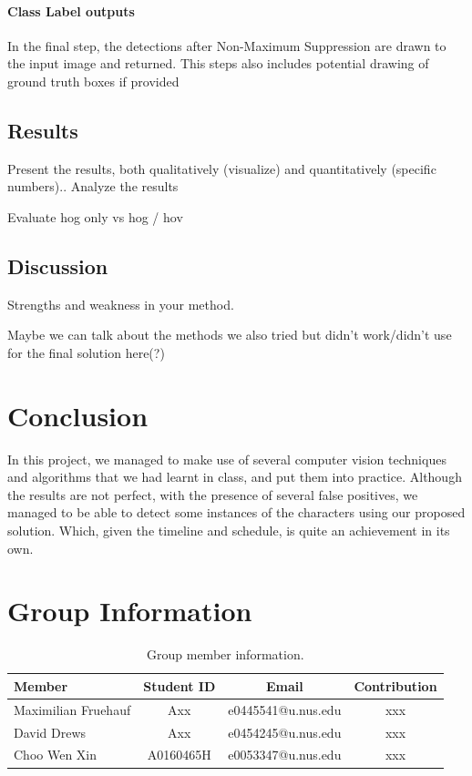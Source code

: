 \documentclass[11pt]{article}
\begin{document}
\paragraph{Class Label outputs}
In the final step, the detections after Non-Maximum Suppression are drawn to the input image and returned. 
This steps also includes potential drawing of ground truth boxes if provided

\subsection{Results}\label{subsec:results}
Present the results, both qualitatively (visualize) and quantitatively (specific numbers)..
Analyze the results

Evaluate hog only vs hog / hov
\subsection{Discussion}
Strengths and weakness in your method.

Maybe we can talk about the methods we also tried but didn't work/didn't use for the final solution here(?)

\section{Conclusion}
In this project, we managed to make use of several computer vision techniques and algorithms that we had learnt in class, and put them into practice. Although the results are not perfect, with the presence of several false positives, we managed to be able to detect some instances of the characters using our proposed solution. Which, given the timeline and schedule, is quite an achievement in its own.

\section{Group Information}
\begin{table}[ht]
    \centering
    \begin{tabular}{lccc}
    \toprule
     Member & Student ID & Email & Contribution\\
    \midrule
    Maximilian Fruehauf& Axx & e0445541@u.nus.edu & xxx \\
    David Drews& Axx &e0454245@u.nus.edu & xxx  \\
    Choo Wen Xin& A0160465H & e0053347@u.nus.edu & xxx  \\
    \bottomrule
    \end{tabular}
    \caption{Group member information.}
    \label{tab:dataset}
\end{table}




 
\end{document}
